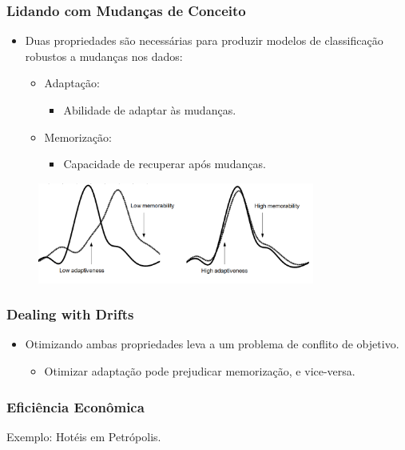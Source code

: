 \documentclass[14pt]{beamer}
\begin{document}
\begin{frame}\frametitle{Lidando com Mudanças de Conceito}

\begin{itemize}
\item Duas propriedades são necessárias para produzir modelos de classificação robustos a mudanças nos dados:
\begin{itemize}
\item Adaptação:
\begin{itemize}
\item Abilidade de adaptar às mudanças.
\end{itemize}
\item Memorização:
\begin{itemize}
\item Capacidade de recuperar após mudanças.
\end{itemize}
\end{itemize}
\end{itemize}

\begin{figure}
\centering
\includegraphics[height=1.30in]{drift3}
\end{figure}
\end{frame}

\begin{frame}\frametitle{Dealing with Drifts}

\begin{itemize}
\item Otimizando ambas propriedades leva a um problema de conflito de objetivo.
\begin{itemize}
\item Otimizar adaptação pode prejudicar memorização, e vice-versa.
\end{itemize}
\end{itemize}

\end{frame}


\begin{frame}\frametitle{Eficiência Econômica}

Exemplo: Hotéis em Petr\'{o}polis.

\centering


\end{frame}
\end{document}
